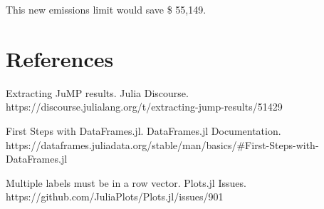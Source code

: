 \documentclass[12pt,a4paper]{article}
\begin{document}
This new emissions limit would save \$ 55,149.

\section{References}
Extracting JuMP results. Julia Discourse. https://discourse.julialang.org/t/extracting-jump-results/51429 

First Steps with DataFrames.jl. DataFrames.jl Documentation. https://dataframes.juliadata.org/stable/man/basics/\#First-Steps-with-DataFrames.jl 

Multiple labels must be in a row vector. Plots.jl Issues. https://github.com/JuliaPlots/Plots.jl/issues/901 
\end{document}
